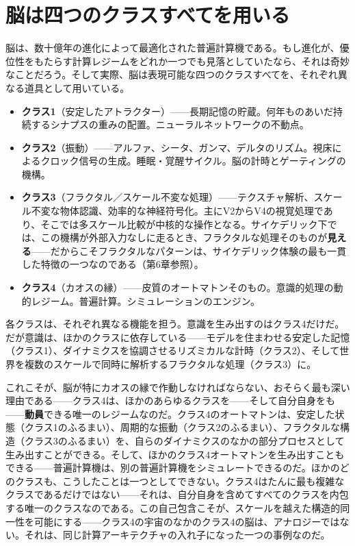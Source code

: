 \documentclass[11pt, twoside, openright]{book}
\begin{document}
\section*{脳は四つのクラスすべてを用いる}

脳は、数十億年の進化によって最適化された普遍計算機である。もし進化が、優位性をもたらす計算レジームをどれか一つでも見落としていたなら、それは奇妙なことだろう。そして実際、脳は表現可能な四つのクラスすべてを、それぞれ異なる道具として用いている。

\begin{itemize}
  \item \textbf{クラス1}（安定したアトラクター）------長期記憶の貯蔵。何年ものあいだ持続するシナプスの重みの配置。ニューラルネットワークの不動点。
  \item \textbf{クラス2}（振動）------アルファ、シータ、ガンマ、デルタのリズム。視床によるクロック信号の生成。睡眠・覚醒サイクル。脳の計時とゲーティングの機構。
  \item \textbf{クラス3}（フラクタル／スケール不変な処理）------テクスチャ解析、スケール不変な物体認識、効率的な神経符号化。主にV2からV4の視覚処理であり、そこでは多スケール比較が中核的な操作となる。サイケデリック下では、この機構が外部入力なしに走るとき、フラクタルな処理そのものが\textbf{見える}------だからこそフラクタルなパターンは、サイケデリック体験の最も一貫した特徴の一つなのである（第6章参照）。
  \item \textbf{クラス4}（カオスの縁）------皮質のオートマトンそのもの。意識的処理の動的レジーム。普遍計算。シミュレーションのエンジン。
\end{itemize}

各クラスは、それぞれ異なる機能を担う。意識を生み出すのはクラス4だけだ。だが意識は、ほかのクラスに依存している------モデルを住まわせる安定した記憶（クラス1）、ダイナミクスを協調させるリズミカルな計時（クラス2）、そして世界を複数のスケールで同時に解析するフラクタルな処理（クラス3）に。

これこそが、脳が特にカオスの縁で作動しなければならない、おそらく最も深い理由である------クラス4は、ほかのあらゆるクラスを------そして自分自身をも------\textbf{動員}できる唯一のレジームなのだ。クラス4のオートマトンは、安定した状態（クラス1のふるまい）、周期的な振動（クラス2のふるまい）、フラクタルな構造（クラス3のふるまい）を、自らのダイナミクスのなかの部分プロセスとして生み出すことができる。そして、ほかのクラス4オートマトンを生み出すこともできる------普遍計算機は、別の普遍計算機をシミュレートできるのだ。ほかのどのクラスも、こうしたことは一つとしてできない。クラス4はたんに最も複雑なクラスであるだけではない------それは、自分自身を含めてすべてのクラスを内包する唯一のクラスなのである。この自己包含こそが、スケールを越えた構造的同一性を可能にする------クラス4の宇宙のなかのクラス4の脳は、アナロジーではない。それは、同じ計算アーキテクチャの入れ子になった一つの事例なのだ。
\end{document}
